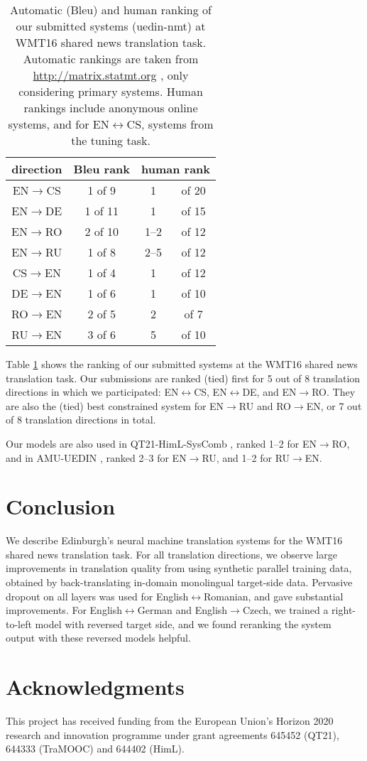 \documentclass[11pt]{article}
\begin{document}
\begin{table}
\centering
\begin{tabular}{c|c|cc}
direction & {\sc Bleu} rank & \multicolumn{2}{c}{human rank}\\
\hline
EN$\to$CS & 1 of \phantom{0}9 & 1 &of 20\\
EN$\to$DE & 1 of 11 & 1 &of 15\\
EN$\to$RO & 2 of 10 & 1--2 &of 12 \\
EN$\to$RU & 1 of \phantom{0}8 & 2--5 &of 12\\
\hline
CS$\to$EN & 1 of \phantom{0}4 & 1 &of 12\\
DE$\to$EN & 1 of \phantom{0}6 & 1 &of 10\\
RO$\to$EN & 2 of \phantom{0}5 & 2 &of \phantom{0}7\\
RU$\to$EN & 3 of \phantom{0}6 & 5 &of 10\\
\end{tabular}
\caption{Automatic ({\sc Bleu}) and human ranking of our submitted systems (uedin-nmt) at WMT16 shared news translation task. Automatic rankings are taken from \url{http://matrix.statmt.org} , only considering primary systems. Human rankings include anonymous online systems, and for EN$\leftrightarrow$CS, systems from the tuning task.}
\label{ranking}
\end{table}

Table \ref{ranking} shows the ranking of our submitted systems at the WMT16 shared news translation task.
Our submissions are ranked (tied) first for 5 out of 8 translation directions in which we participated: EN$\leftrightarrow$CS, EN$\leftrightarrow$DE, and EN$\to$RO.
They are also the (tied) best constrained system for EN$\to$RU and RO$\to$EN, or 7 out of 8 translation directions in total.

Our models are also used in QT21-HimL-SysComb \cite{qt21syscomb2016}, ranked 1--2 for EN$\to$RO, and in AMU-UEDIN \cite{junczys2016}, ranked 2--3 for EN$\to$RU, and 1--2 for RU$\to$EN.

\section{Conclusion}

We describe Edinburgh's neural machine translation systems for the WMT16 shared news translation task.
For all translation directions, we observe large improvements in translation quality from using synthetic parallel training data, obtained by back-translating in-domain monolingual target-side data.
Pervasive dropout on all layers was used for English$\leftrightarrow$Romanian, and gave substantial improvements.
For English$\leftrightarrow$German and English$\to$Czech, we trained a right-to-left model with reversed target side, and we found reranking the system output with these reversed models helpful.

\section*{Acknowledgments}

This project has received funding from the European Union's Horizon 2020 research and innovation
programme under grant agreements 645452 (QT21), 644333 (TraMOOC) and 644402 (HimL).



\end{document}
